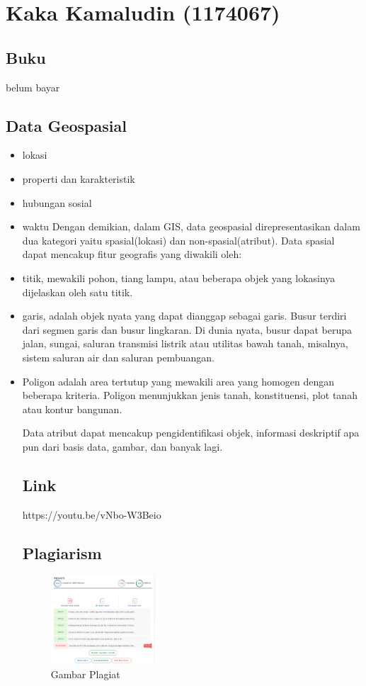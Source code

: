 \section{Kaka Kamaludin (1174067)}
\subsection{Buku}
belum bayar
\subsection{Data Geospasial}
\begin{itemize}
Data geospasial (GD) adalah informasi yang entah bagaimana dilampirkan ke lokasi objek tertentu. Biasanya, informasi ini disimpan dalam bentuk koordinat geografis dan topologi. Jumlah data tersebut tumbuh pada tingkat yang mengejutkan, karena sebagian besar dibuat bukan oleh orang-orang, tetapi oleh berbagai perangkat.
	Data geografis berisi empat komponen terintegrasi:
	\item lokasi
	\item properti dan karakteristik
	\item hubungan sosial
	\item waktu
Dengan demikian, dalam GIS, data geospasial direpresentasikan dalam dua kategori yaitu spasial(lokasi) dan non-spasial(atribut). Data spasial dapat mencakup fitur geografis yang diwakili oleh:
 	\item titik, mewakili pohon, tiang lampu, atau beberapa objek yang lokasinya dijelaskan oleh satu titik.
 	\item garis,  adalah objek nyata yang dapat dianggap sebagai garis. Busur terdiri dari segmen garis dan busur lingkaran. Di dunia nyata, busur dapat berupa jalan, sungai, saluran transmisi listrik atau utilitas bawah tanah, misalnya, sistem saluran air dan saluran pembuangan.
 	\item Poligon adalah area tertutup yang mewakili area yang homogen dengan beberapa kriteria. Poligon menunjukkan jenis tanah, konstituensi, plot tanah atau kontur bangunan.
 
Data atribut dapat mencakup pengidentifikasi objek, informasi deskriptif apa pun dari basis data, gambar, dan banyak lagi.
\subsection{Link}
https://youtu.be/vNbo-W3Beio
\subsection{Plagiarism}
\begin{figure}[H]
	\includegraphics[width=4cm]{figures/Tugas1/1174074/plagiat.png}
	\centering
	\caption{Gambar Plagiat}
\end{figure}

\end{itemize}
